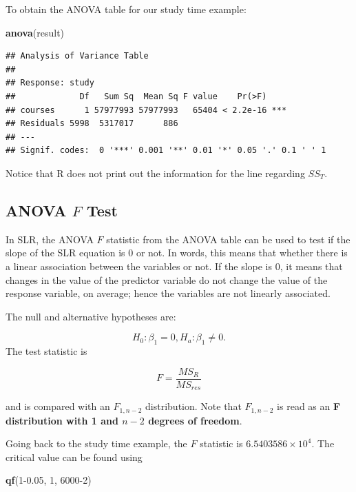 \documentclass[
]{book}
\newenvironment{Shaded}{\begin{snugshade}}{\end{snugshade}}
\newcommand{\DecValTok}[1]{\textcolor[rgb]{0.00,0.00,0.81}{#1}}
\newcommand{\FloatTok}[1]{\textcolor[rgb]{0.00,0.00,0.81}{#1}}
\newcommand{\FunctionTok}[1]{\textcolor[rgb]{0.13,0.29,0.53}{\textbf{#1}}}
\newcommand{\NormalTok}[1]{#1}
\begin{document}
To obtain the ANOVA table for our study time example:

\begin{Shaded}
\begin{Highlighting}[]
\FunctionTok{anova}\NormalTok{(result)}
\end{Highlighting}
\end{Shaded}

\begin{verbatim}
## Analysis of Variance Table
## 
## Response: study
##             Df   Sum Sq  Mean Sq F value    Pr(>F)    
## courses      1 57977993 57977993   65404 < 2.2e-16 ***
## Residuals 5998  5317017      886                      
## ---
## Signif. codes:  0 '***' 0.001 '**' 0.01 '*' 0.05 '.' 0.1 ' ' 1
\end{verbatim}

Notice that R does not print out the information for the line regarding \(SS_T\).

\hypertarget{anova-f-test}{%
\subsection{\texorpdfstring{ANOVA \(F\) Test}{ANOVA F Test}}\label{anova-f-test}}

In SLR, the ANOVA \(F\) statistic from the ANOVA table can be used to test if the slope of the SLR equation is 0 or not. In words, this means that whether there is a linear association between the variables or not. If the slope is 0, it means that changes in the value of the predictor variable do not change the value of the response variable, on average; hence the variables are not linearly associated.

The null and alternative hypotheses are:

\[
H_0: \beta_1 = 0, H_a: \beta_1 \neq 0.
\]
The test statistic is

\begin{equation} 
F = \frac{MS_R}{MS_{res}}
\label{eq:ANOVA}
\end{equation}

and is compared with an \(F_{1,n-2}\) distribution. Note that \(F_{1,n-2}\) is read as an \textbf{F distribution with 1 and \(n-2\) degrees of freedom}.

Going back to the study time example, the \(F\) statistic is \ensuremath{6.5403586\times 10^{4}}. The critical value can be found using

\begin{Shaded}
\begin{Highlighting}[]
\FunctionTok{qf}\NormalTok{(}\DecValTok{1}\FloatTok{{-}0.05}\NormalTok{, }\DecValTok{1}\NormalTok{, }\DecValTok{6000{-}2}\NormalTok{)}
\end{Highlighting}
\end{Shaded}
\end{document}
